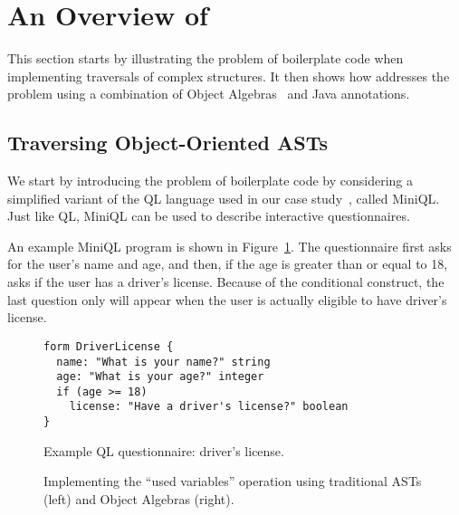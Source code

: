 \section{An Overview of \name}\label{subsec:overview}

This section starts by illustrating the problem of boilerplate code when implementing
traversals of complex structures. It then shows how \name addresses
the problem using a combination of Object Algebras~\cite{bruno12oa}
and Java annotations.



\subsection{Traversing Object-Oriented ASTs  }


We start by introducing the problem of boilerplate code by considering
a simplified variant of the QL language used in our case
study~\cite{gouseti14extensible}, called MiniQL.  Just like QL, MiniQL
can be used to describe interactive questionnaires.

An example MiniQL program is
shown in Figure~\ref{driver_license}.  The questionnaire first asks
for the user's name and age, and then, if the age is greater than or
equal to 18, asks if the user has a driver's license.  Because of the
conditional construct, the last question only will appear when the
user is actually eligible to have driver's license.

\begin{figure}[t]
\nocaptionrule
\begin{lstlisting}[language=ql]
form DriverLicense {
  name: "What is your name?" string
  age: "What is your age?" integer
  if (age >= 18)
    license: "Have a driver's license?" boolean
}
\end{lstlisting}
\caption{Example QL questionnaire: driver's license.}
\vspace{-.15in}
\label{driver_license}
\end{figure}

\begin{figure*}[t!]
  \nocaptionrule
  \begin{minipage}[t]{0.48\textwidth}
  \end{minipage}
  \vline
  \hspace*{2pt}
  \begin{minipage}[t]{0.48\textwidth}
  \end{minipage}

    \caption{Implementing the ``used variables'' operation using traditional ASTs (left) and Object Algebras (right).}\label{LST:usedVars}
\end{figure*}

